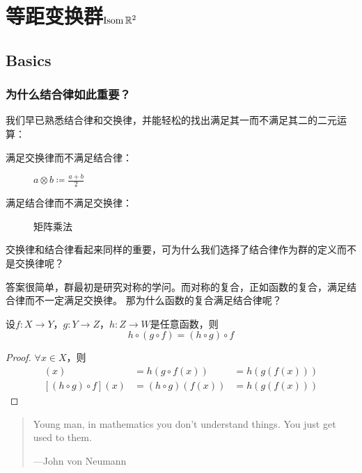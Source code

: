 \chapter{等距变换群\(\operatorname{\mathrm{Isom}} \mathbb{R}^{2}\)}

\section{Basics}

\subsection{为什么结合律如此重要？}
我们早已熟悉结合律和交换律，并能轻松的找出满足其一而不满足其二的二元运算：

\begin{description}
    \item[满足交换律而不满足结合律：] \(a \otimes b \coloneq \frac{a+b}{2}\)
    \item[满足结合律而不满足交换律：] 矩阵乘法
\end{description}

交换律和结合律看起来同样的重要，可为什么我们选择了结合律作为群的定义而不是交换律呢？

答案很简单，群最初是研究对称的学问。而对称的复合，正如函数的复合，满足结合律而不一定满足交换律。
那为什么函数的复合满足结合律呢？

\begin{theorem}
    设\(f: X\to Y\)，\(g: Y\to Z\)，\(h: Z\to W\)是任意函数，则
    \[
        h\circ(g\circ f)=(h\circ g)\circ f
    \]
\end{theorem}

\begin{proof}
    \(\forall x\in X\)，则
    \begin{align*}
        [h\circ(g\circ f)](x) & = h(g \circ f(x))  & = h(g(f(x))) \\
        [(h\circ g)\circ f](x) & = (h\circ g)(f(x)) & = h(g(f(x)))
    \end{align*}
\end{proof}

\begin{quote}
    Young man, in mathematics you don't understand things.
    You just get used to them.

    \hfill ---John von Neumann
\end{quote}

